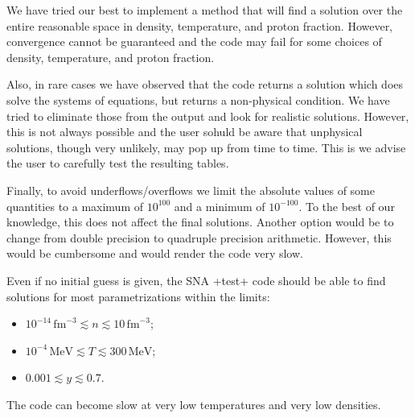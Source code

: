 \documentclass[letterpaper,11pt]{refart}
\begin{document}
We have tried our best to implement a method that will find a solution
over the entire reasonable space in density, temperature, and proton
fraction. However, convergence cannot be guaranteed and the code may
fail for some choices of density, temperature, and proton fraction.

Also, in rare cases we have observed that the code returns a solution
which does solve the systems of equations, but returns a non-physical
condition.  We have tried to eliminate those from the output and look
for realistic solutions.  However, this is not always possible and the
user sohuld be aware that unphysical solutions, though very unlikely,
may pop up from time to time. This is we advise the user to carefully
test the resulting tables.

Finally, to avoid underflows/overflows we limit the absolute values of
some quantities to a maximum of $10^{100}$ and a minimum of
$10^{-100}$. To the best of our knowledge, this does not affect the
final solutions. Another option would be to change from double
precision to quadruple precision arithmetic. However, this would be
cumbersome and would render the code very slow.

\vspace*{-0.1cm}
Even if no initial guess is given, the SNA \verbexec+test+ code should
be able to find solutions for most parametrizations within the limits:
\begin{itemize}
 \item $10^{-14}\,\mathrm{fm}^{-3}\lesssim{n}\lesssim 10 \, \mathrm{fm}^{-3}$;
 \item $10^{-4}\,\mathrm{MeV}\lesssim{T}\lesssim 300\,\mathrm{MeV}$;
 \item $0.001\lesssim y \lesssim 0.7$.
\end{itemize}
The code can become slow at very low temperatures and
very low densities.





\vspace*{-0.3cm}
\end{document}
